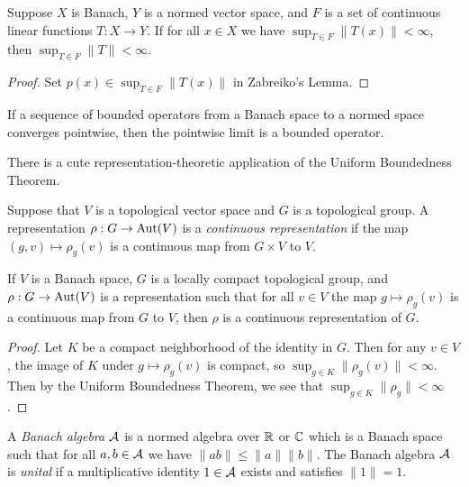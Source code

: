 \begin{thm} Suppose $X$ is Banach, $Y$ is a normed vector space, and $F$ is a set of continuous linear functions $T:X\rightarrow Y$. If for all $x \in X$ we have $\sup_{T\in F} \|T(x)\| < \infty$, then $\sup_{T \in F} \|T\| < \infty$.
\end{thm}
\begin{proof} Set $p(x) \in \sup_{T\in F} \|T(x)\|$ in Zabreiko's Lemma.
\end{proof}

\begin{cor} If a sequence of bounded operators from a Banach space to a normed space converges pointwise, then the pointwise limit is a bounded operator.
\end{cor}

There is a cute representation-theoretic application of the Uniform Boundedness Theorem.

\begin{defn} Suppose that $V$ is a topological vector space and $G$ is a topological group. A representation $\rho : G \rightarrow \operatorname{Aut}(V)$ is a \emph{continuous representation} if the map $(g,v) \mapsto \rho_g(v)$ is a continuous map from $G\times V$ to $V$.
\end{defn}

\begin{thm} If $V$ is a Banach space, $G$ is a locally compact topological group, and $\rho : G \rightarrow \operatorname{Aut}(V)$ is a representation such that for all $v \in V$ the map $g \mapsto \rho_g(v)$ is a continuous map from $G$ to $V$, then $\rho$ is a continuous representation of $G$.
\end{thm}
\begin{proof} Let $K$ be a compact neighborhood of the identity in $G$. Then for any $v \in V$, the image of $K$ under $g \mapsto \rho_g(v)$ is compact, so $\sup_{g \in K} \|\rho_g(v)\| < \infty$. Then by the Uniform Boundedness Theorem, we see that $\sup_{g \in K} \|\rho_g\| < \infty$.
\end{proof}


\begin{defn} A \emph{Banach algebra} $\mathcal{A}$ is a normed algebra over $\mathbb{R}$ or $\mathbb{C}$ which is a Banach space such that for all $a,b \in \mathcal{A}$ we have $\|ab\| \le \|a\|\|b\|$. The Banach algebra $\mathcal{A}$ is \emph{unital} if a multiplicative identity $1 \in \mathcal{A}$ exists and satisfies $\|1\| = 1$.
\end{defn}


